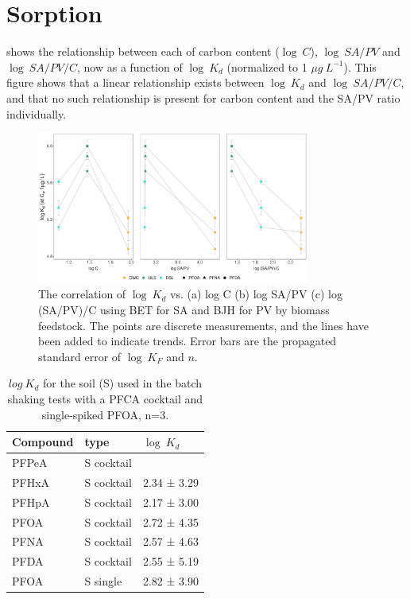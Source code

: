 \chapter{Sorption}\label{appSec:Sorption} 

 shows the relationship between each of carbon content ($\log~C$), $\log~SA/PV$ and $\log~SA/PV/C$, now as a function of $\log~K_d$ (normalized to 1 $\mu g~L^{-1}$). This figure shows that a linear relationship exists between $\log~K_d$ and $\log~SA/PV/C$, and that no such relationship is present for carbon content and the SA/PV ratio individually. 

\begin{figure}[htb]
    \centering
    \includegraphics[width=0.8\textwidth]{R/figs/SAPV_C_Kd1ugL_plot.pdf}
    \caption{The correlation of $\log~K_d$ vs. (a) log C (b) log SA/PV (c) log (SA/PV)/C using BET for SA and BJH for PV by biomass feedstock. The points are discrete measurements, and the lines have been added to indicate trends. Error bars are the propagated standard error of $\log~K_F$ and $n$.}
    \label{appfig:Kd_SAPV_C}
\end{figure}

\begin{table}[ht]
\caption{$log~K_d$ for the soil (S) used in the batch shaking tests with a PFCA cocktail and single-spiked PFOA, n=3.}
\centering
\label{apptab:soil_Kd}
\begin{tabular}{lll} \toprule
Compound & type       & $\log~K_d$ \\ \midrule
PFPeA    & S cocktail &                                 \\
PFHxA    & S cocktail & 2.34  ± 3.29                     \\
PFHpA    & S cocktail & 2.17  ± 3.00                     \\
PFOA     & S cocktail & 2.72  ± 4.35                     \\
PFNA     & S cocktail & 2.57  ± 4.63                     \\
PFDA     & S cocktail & 2.55  ± 5.19                     \\
PFOA     & S single   & 2.82 ± 3.90  \\ \bottomrule
\end{tabular}
\end{table}


